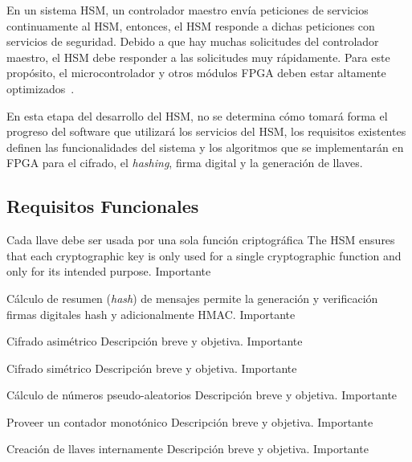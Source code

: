 \documentclass{article}
\begin{document}
En un sistema HSM, un controlador maestro envía peticiones de servicios continuamente al HSM, entonces, el HSM responde a dichas peticiones con servicios de seguridad. Debido a que hay muchas solicitudes del controlador maestro, el HSM debe responder a las solicitudes muy rápidamente. Para este propósito, el microcontrolador y otros módulos FPGA deben estar altamente optimizados~\cite{evita-hsm:2012}. 

En esta etapa del desarrollo del HSM, no se determina cómo tomará forma el progreso del software que utilizará los servicios del HSM, los requisitos existentes definen las funcionalidades del sistema y los algoritmos que se implementarán en FPGA para el cifrado, el \textit{hashing}, firma digital y la generación de llaves.

    \subsection{Requisitos Funcionales}
    \begin{functional}
          {Cada llave debe ser usada por una sola función criptográfica}
      {The HSM ensures that each cryptographic key is only used for a single cryptographic function and only for its intended purpose.}
      {Importante}
    
          {Cálculo de resumen (\textit{hash}) de mensajes}
      {permite la generación y verificación firmas digitales hash y adicionalmente HMAC.}
      {Importante}
            
      {Cifrado asimétrico}
      {Descripción breve y objetiva.}
      {Importante}
            
      {Cifrado simétrico}
      {Descripción breve y objetiva.}
      {Importante}
            
      {Cálculo de números pseudo-aleatorios}
      {Descripción breve y objetiva.}
      {Importante}
            
            {Proveer un contador monotónico}
            {Descripción breve y objetiva.}
            {Importante}
            
            {Creación de llaves internamente}
            {Descripción breve y objetiva.}
            {Importante}
            
    \end{functional}
\end{document}
